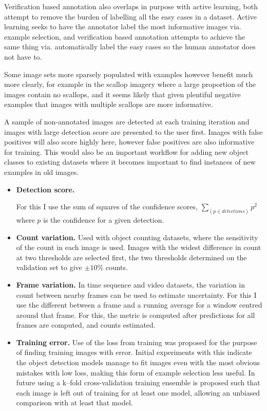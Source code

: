 Verification based annotation also overlaps in purpose with active learning, both attempt to remove the burden of labelling all the easy cases in a dataset. Active learning seeks to have the annotator label the most informative images via. example selection, and verification based annotation attempts to achieve the same thing via. automatically label the easy cases so the human annotator does not have to.

Some image sets more sparsely populated with examples however benefit much more clearly, for example in the scallop imagery where a large proportion of the images contain no scallops, and it seems likely that given plentiful negative examples that images with multiple scallops are more informative. 

A sample of non-annotated images are detected at each training iteration and images with large detection score are presented to the user first. Images with false positives will also score highly here, however false positives are also informative for training. This would also be an important workflow for adding new object classes to existing datasets where it becomes important to find instances of new examples in old images.


\begin{itemize}
\item {\bf Detection score. }

For this I use the sum of squares of the confidence scores, $ \sum_(p \in detections){ p^2 } $ where $p$ is the confidence for a given detection. 

    \item {\bf Count variation. }
Used with object counting datasets, where the sensitivity of the count in each image is used. Images with the widest difference in count at two thresholds are selected first, the two thresholds determined on the validation set to give $ \pm 10\% $ counts.
    \item {\bf Frame variation. } 
In time sequence and video datasets, the variation in count between nearby frames can be used to estimate uncertainty. For this I use the different between a frame and a running average for a window centred around that frame. For this, the metric is computed after predictions for all frames are computed, and counts estimated.
    \item {\bf Training error. }
Use of the loss from training was proposed for the purpose of finding training images with error. Initial experiments with this indicate the object detection models manage to fit images even with the most obvious mistakes with low loss, making this form of example selection less useful. In future using a k--fold cross-validation training ensemble is proposed such that each image is left out of training for at least one model, allowing an unbiased comparison with at least that model.
\end{itemize}


